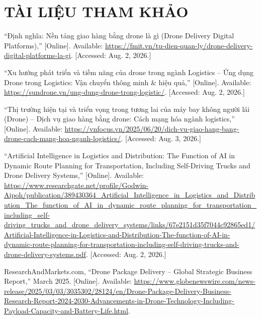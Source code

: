 \chapter{TÀI LIỆU THAM KHẢO
}

\noindent
[1] ``Định nghĩa: Nền tảng giao hàng bằng drone là gì
(Drone Delivery Digital Platforms),'' [Online].
Available:
\url{https://fmit.vn/tu-dien-quan-ly/drone-delivery-digital-platforms-la-gi}.
[Accessed: Aug. 2, 2026.]

\vspace{6pt}

\noindent
[2] ``Xu hướng phát triển và tiềm năng của drone trong ngành Logistics --
Ứng dụng Drone trong Logistics: Vận chuyển thông minh \& hiệu quả,''
[Online].
Available:
\url{https://sundrone.vn/ung-dung-drone-trong-logistic/}.
[Accessed: Aug. 2, 2026.]

\vspace{6pt}

\noindent
[3] ``Thị trường hiện tại và triển vọng trong tương lai của máy bay
không người lái (Drone) -- Dịch vụ giao hàng bằng drone:
Cách mạng hóa ngành logistics,'' [Online].
Available:
\url{https://vnfocus.vn/2025/06/20/dich-vu-giao-hang-bang-drone-cach-mang-hoa-nganh-logistics/}.
[Accessed: Aug. 3, 2026.]

\vspace{6pt}

\noindent
[4] ``Artificial Intelligence in Logistics and Distribution:
The Function of AI in Dynamic Route Planning for Transportation,
Including Self-Driving Trucks and Drone Delivery Systems,'' [Online].
Available:
\url{https://www.researchgate.net/profile/Godwin-Aipoh/publication/389430364_Artificial_Intelligence_in_Logistics_and_Distribution_The_function_of_AI_in_dynamic_route_planning_for_transportation_including_self-driving_trucks_and_drone_delivery_systems/links/67e2151d35f7044c92865ed1/Artificial-Intelligence-in-Logistics-and-Distribution-The-function-of-AI-in-dynamic-route-planning-for-transportation-including-self-driving-trucks-and-drone-delivery-systems.pdf}.
[Accessed: Aug. 2, 2026.]

\vspace{6pt}

\noindent
[5] ResearchAndMarkets.com,
``Drone Package Delivery -- Global Strategic Business Report,''
March 2025. [Online].
Available:
\url{https://www.globenewswire.com/news-release/2025/03/03/3035302/28124/en/Drone-Package-Delivery-Business-Research-Report-2024-2030-Advancements-in-Drone-Technology-Including-Payload-Capacity-and-Battery-Life.html}.